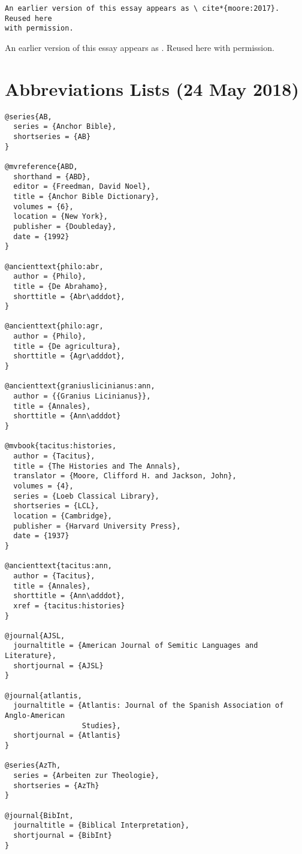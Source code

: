 \documentclass[a4paper]{article}
\begin{document}
\texttt{An earlier version of this essay appears as \textbackslash
cite*\{moore:2017\}. Reused here\\ with permission.}

An earlier version of this essay appears as \cite*{moore:2017}. Reused here
with permission.

\exampleabbreviations
\examplebibliography
{}

\section{Abbreviations Lists (24 May 2018)}

\begin{verbatim}
@series{AB,
  series = {Anchor Bible},
  shortseries = {AB}
}

@mvreference{ABD,
  shorthand = {ABD},
  editor = {Freedman, David Noel},
  title = {Anchor Bible Dictionary},
  volumes = {6},
  location = {New York},
  publisher = {Doubleday},
  date = {1992}
}

@ancienttext{philo:abr,
  author = {Philo},
  title = {De Abrahamo},
  shorttitle = {Abr\adddot},
}

@ancienttext{philo:agr,
  author = {Philo},
  title = {De agricultura},
  shorttitle = {Agr\adddot},
}

@ancienttext{graniuslicinianus:ann,
  author = {{Granius Licinianus}},
  title = {Annales},
  shorttitle = {Ann\adddot}
}

@mvbook{tacitus:histories,
  author = {Tacitus},
  title = {The Histories and The Annals},
  translator = {Moore, Clifford H. and Jackson, John},
  volumes = {4},
  series = {Loeb Classical Library},
  shortseries = {LCL},
  location = {Cambridge},
  publisher = {Harvard University Press},
  date = {1937}
}

@ancienttext{tacitus:ann,
  author = {Tacitus},
  title = {Annales},
  shorttitle = {Ann\adddot},
  xref = {tacitus:histories}
}

@journal{AJSL,
  journaltitle = {American Journal of Semitic Languages and Literature},
  shortjournal = {AJSL}
}

@journal{atlantis,
  journaltitle = {Atlantis: Journal of the Spanish Association of Anglo-American
                  Studies},
  shortjournal = {Atlantis}
}

@series{AzTh,
  series = {Arbeiten zur Theologie},
  shortseries = {AzTh}
}

@journal{BibInt,
  journaltitle = {Biblical Interpretation},
  shortjournal = {BibInt}
}


\end{verbatim}
\end{document}

